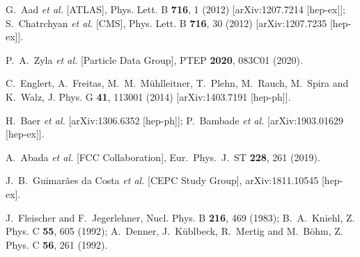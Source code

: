 \documentclass[12pt]{article}
\begin{document}
\begin{thebibliography}{99}
\frenchspacing

G.~Aad \textit{et al.} [ATLAS],
Phys. Lett. B \textbf{716}, 1 (2012)
[arXiv:1207.7214 [hep-ex]];
S.~Chatrchyan \textit{et al.} [CMS],
Phys. Lett. B \textbf{716}, 30 (2012)
[arXiv:1207.7235 [hep-ex]].

P.~A.~Zyla \textit{et al.} [Particle Data Group],
PTEP \textbf{2020}, 083C01 (2020).

C.~Englert, A.~Freitas, M.~M.~M\"uhlleitner, T.~Plehn, M.~Rauch, M.~Spira and K.~Walz,
J. Phys. G \textbf{41}, 113001 (2014)
[arXiv:1403.7191 [hep-ph]].

H.~Baer \textit{et al.}
[arXiv:1306.6352 [hep-ph]];
P.~Bambade \textit{et al.}
[arXiv:1903.01629 [hep-ex]].

  A.~Abada {\it et al.} [FCC Collaboration],
  Eur.\ Phys.\ J.\ ST {\bf 228}, 261 (2019).
  
  J.~B.~Guimar\~aes da Costa {\it et al.} [CEPC Study Group],
  arXiv:1811.10545 [hep-ex].

J.~Fleischer and F.~Jegerlehner,
Nucl. Phys. B \textbf{216}, 469 (1983);
B.~A.~Kniehl,
Z. Phys. C \textbf{55}, 605 (1992);
A.~Denner, J.~K\"ublbeck, R.~Mertig and M.~B\"ohm,
Z. Phys. C \textbf{56}, 261 (1992).


\end{thebibliography}
\end{document}
